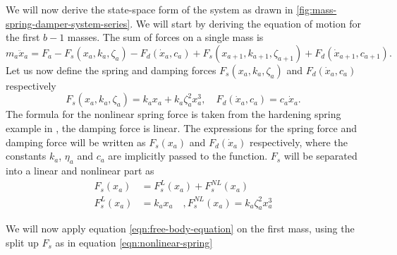 We will now derive the state-space form of the system as drawn in \autoref{fig:mass-spring-damper-system-series}. We will start by deriving the equation of motion for the first $b-1$ masses. The sum of forces on a single mass is
\begin{equation}\label{eqn:free-body-equation}
    m_a\ddot{x}_a = F_a - F_s(x_a,k_a,\zeta_a) - F_d(\dot{x}_a,c_a) + F_s(x_{a+1},k_{a+1},\zeta_{a+1}) + F_d(\dot{x}_{a+1},c_{a+1}).
\end{equation}
Let us now define the spring and damping forces $F_s(x_a,k_a,\zeta_a)$ and $F_d(\dot{x}_a,c_a)$ respectively
\begin{equation*}
    F_s(x_a,k_a,\zeta_a) = k_ax_a + k_a \zeta_a^2 x_a^3, \quad F_d(\dot{x}_a,c_a) = c_a\dot{x}_a.
\end{equation*}
The formula for the nonlinear spring force is taken from the hardening spring example in \cite[Section 1.2.3]{Khalil2002NonlinearSystems}, the damping force is linear. The expressions for the spring force and damping force will be written as $F_s(x_a)$ and $F_d(\dot{x}_a)$ respectively, where the constants $k_a$, $\eta_a$ and $c_a$ are implicitly passed to the function. $F_s$ will be separated into a linear and nonlinear part as
\begin{equation}\label{eqn:nonlinear-spring}
    \begin{split}
        F_s(x_a) &= F_s^L(x_a) + F_s^{NL}(x_a) \\
        F_s^L(x_a) &= k_ax_a \quad , F_s^{NL}(x_a) = k_a\zeta_a^2x^3_a
    \end{split}    
\end{equation}

We will now apply equation \eqref{eqn:free-body-equation} on the first mass, using the split up $F_s$ as in equation \eqref{eqn:nonlinear-spring}

